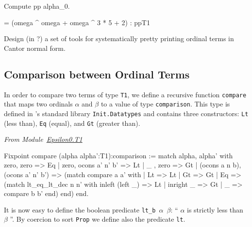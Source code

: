 \begin{Coqsrc}
Compute pp alpha_0.
\end{Coqsrc}

\begin{Coqanswer}
     = (omega ^ omega + omega ^ 3 * 5 + 2)%
     : ppT1
\end{Coqanswer}

\begin{project}
Design  (in \ocaml?) a set of tools for systematically pretty printing ordinal terms in Cantor normal form.
\end{project}


\subsection{Comparison between Ordinal Terms}
\label{sec:orgheadline73}



In order to compare two terms of type \texttt{T1}, we define a recursive function \texttt{compare} that maps two ordinals $\alpha$ and $\beta$ to a value of type \texttt{comparison}. This type is defined in \coq's standard library 
\texttt{Init.Datatypes} and
contains three constructors:  \texttt{Lt} (less than), \texttt{Eq} (equal), and
\texttt{Gt} (greater than).


\vspace{4pt}
\emph{From Module~\href{../theories/html/hydras.Epsilon0.T1.html\#compare}{Epsilon0.T1}}


\begin{Coqsrc}
Fixpoint compare (alpha alpha':T1):comparison :=
  match alpha, alpha' with
    zero, zero => Eq
  | zero, ocons a' n' b' => Lt
  | _   , zero => Gt
  | (ocons a n b),(ocons a' n' b') =>
      (match compare a a' with 
          | Lt => Lt
          | Gt => Gt
          | Eq => (match lt_eq_lt_dec n n'
                   with
                       inleft  (left _) => Lt
                     | inright _ => Gt
                     |   _ => compare b b'
                   end)
       end)
  end.
\end{Coqsrc}
 
It is now easy to define the boolean predicate \texttt{lt\_b $\alpha$ $\beta$}: 
`` $\alpha$ is strictly less than $\beta$ ''. By coercion to sort \texttt{Prop} we define also the predicate \texttt{lt}.

